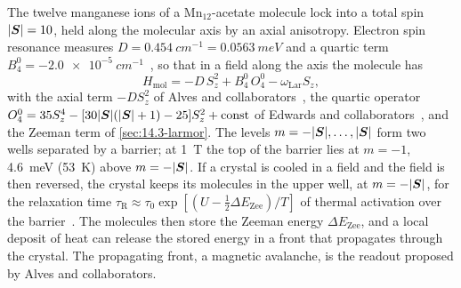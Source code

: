 The twelve manganese ions of a Mn$_{12}$-acetate molecule lock into a total spin $|\bm{S}| = 10$, held along the molecular axis by an axial anisotropy. Electron spin resonance measures $D = \SI{0.454}{cm^{-1}} = \SI{0.0563}{meV}$ and a quartic term $B_4^0 = \SI{-2.0e-5}{cm^{-1}}$~\cite[Fig.~2]{edwards2003evidence}, so that in a field along the axis the molecule has
\begin{equation}
  H_{\mathrm{mol}} = -D\,S_z^2 + B_4^0\,O_4^0 - \omega_{\mathrm{Lar}}S_z ,
  \label{eq:14.5-Hmol}
\end{equation}
with the axial term $-DS_z^2$ of Alves and collaborators~\cite[Eq.~(3)]{alves2026search}, the quartic operator $O_4^0 = 35S_z^4 - [30|\bm{S}|(|\bm{S}| + 1) - 25]S_z^2 + \text{const}$ of Edwards and collaborators~\cite{edwards2003evidence}, and the Zeeman term of \cref{sec:14.3-larmor}. The levels $m = -|\bm{S}|, \dots, |\bm{S}|$ form two wells separated by a barrier; at \SI{1}{T} the top of the barrier lies at $m = -1$, \SI{4.6}{meV} (\SI{53}{K}) above $m = -|\bm{S}|$. If a crystal is cooled in a field and the field is then reversed, the crystal keeps its molecules in the upper well, at $m = -|\bm{S}|$, for the relaxation time $\tau_{\mathrm{R}} \approx \tau_0\exp[(U - \frac12\Delta E_{\mathrm{Zee}})/T]$ of thermal activation over the barrier~\cite[Eq.~(4)]{alves2026search}. The molecules then store the Zeeman energy $\Delta E_{\mathrm{Zee}}$, and a local deposit of heat can release the stored energy in a front that propagates through the crystal. The propagating front, a magnetic avalanche, is the readout proposed by Alves and collaborators.

